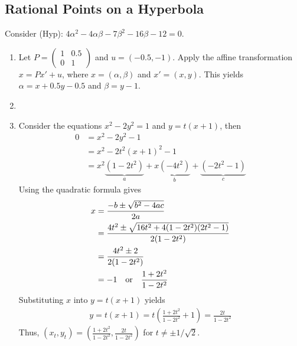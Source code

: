 \documentclass{article}
\begin{document}
\subsection{Rational Points on a Hyperbola}
  Consider (Hyp): $4\alpha^2-4\alpha\beta-7\beta^2-16\beta-12=0$.
  \begin{enumerate}[label=\textbf{(\alph*)}]
    \item{
      Let $P=\left(\begin{smallmatrix}1&0.5\\0&1\end{smallmatrix}\right)$ and
      $u=(-0.5,-1)$. Apply the affine transformation $x=Px'+u$, where $x=(\alpha,
      \beta)$ and $x'=(x,y)$. This yields $\alpha=x+0.5y-0.5$ and $\beta=y-1$.
    }
    \item{
      \begin{figure}[H]
        \hspace*{1cm}
      \end{figure}
    }
    \item{
      Consider the equations $x^2-2y^2=1$ and $y=t(x+1)$, then
      \begin{align*}
        0 &= x^2-2y^2-1\\
          &= x^2-2t^2(x+1)^2-1\\
          &= x^2\underbrace{(1-2t^2)}_a+x\underbrace{(-4t^2)}_b+
            \underbrace{(-2t^2-1)}_c
      \end{align*}
      Using the quadratic formula gives
      \begin{align*}
        x &= \frac{-b\pm\sqrt{b^2-4ac}}{2a}\\
          &= \frac{4t^2\pm\sqrt{16t^2+4(1-2t^2)(2t^2-1)}}{2(1-2t^2)}\\
          &= \frac{4t^2\pm2}{2(1-2t^2)}\\
          &=-1\text{\quad or\quad}\frac{1+2t^2}{1-2t^2}\\
      \end{align*}
      Substituting $x$ into $y=t(x+1)$ yields
      \begin{align*}
        y = t(x+1)
          = t\left(\frac{1+2t^2}{1-2t^2}+1\right)
          = \frac{2t}{1-2t^2}
      \end{align*}
      Thus, $(x_t,y_t)=\left(\frac{1+2t^2}{1-2t^2},\frac{2t}{1-2t^2}\right)$ for
      $t\ne\pm1/\sqrt{2}$.

}
\end{enumerate}
\end{document}
